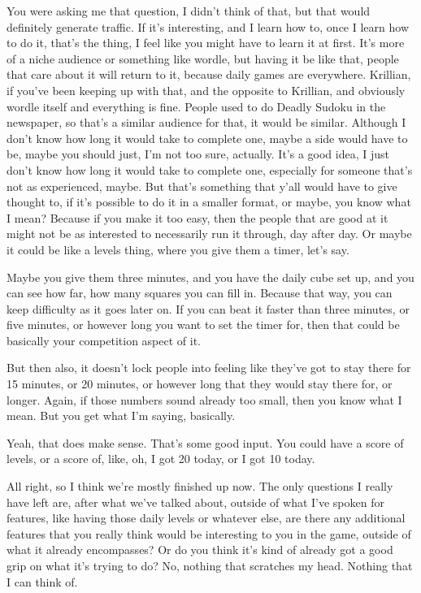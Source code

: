 \documentclass{article}
\begin{document}
You were asking me that question, I didn't think of that, but that would definitely generate traffic. If
it's interesting, and I learn how to, once I learn how to do it, that's the thing, I feel like you might
have to learn it at first. It's more of a niche audience or something like wordle, but having it be like
that, people that care about it will return to it, because daily games are everywhere.
Krillian, if you've been keeping up with that, and the opposite to Krillian, and obviously wordle
itself and everything is fine. People used to do Deadly Sudoku in the newspaper, so that's a
similar audience for that, it would be similar. Although I don't know how long it would take to
complete one, maybe a side would have to be, maybe you should just, I'm not too sure, actually.
It's a good idea, I just don't know how long it would take to complete one, especially for someone
that's not as experienced, maybe. But that's something that y'all would have to give thought to, if
it's possible to do it in a smaller format, or maybe, you know what I mean? Because if you make it
too easy, then the people that are good at it might not be as interested to necessarily run it
through, day after day. Or maybe it could be like a levels thing, where you give them a timer, let's
say.

Maybe you give them three minutes, and you have the daily cube set up, and you can see how
far, how many squares you can fill in. Because that way, you can keep difficulty as it goes later
on. If you can beat it faster than three minutes, or five minutes, or however long you want to set
the timer for, then that could be basically your competition aspect of it.

But then also, it doesn't lock people into feeling like they've got to stay there for 15 minutes, or 20
minutes, or however long that they would stay there for, or longer. Again, if those numbers sound
already too small, then you know what I mean. But you get what I'm saying, basically.

Yeah, that does make sense. That's some good input. You could have a score of levels, or a
score of, like, oh, I got 20 today, or I got 10 today.

All right, so I think we're mostly finished up now. The only questions I really have left are, after
what we've talked about, outside of what I've spoken for features, like having those daily levels or
whatever else, are there any additional features that you really think would be interesting to you
in the game, outside of what it already encompasses? Or do you think it's kind of already got a
good grip on what it's trying to do? No, nothing that scratches my head. Nothing that I can think
of.
\end{document}
